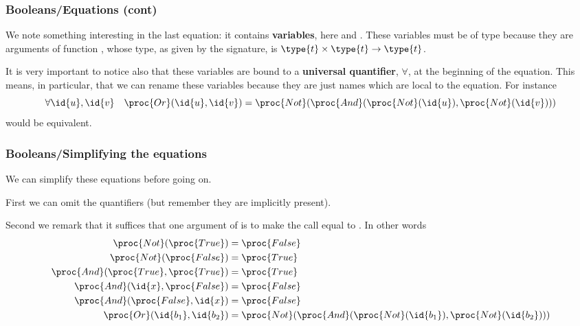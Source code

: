 %
\begin{frame}
\frametitle{Booleans/Equations (cont)}

We note something interesting in the last equation: it contains
\textbf{variables}, here  and . These variables must
be of type  because they are arguments of function ,
whose type, as given by the signature, is \(\type{t} \times \type{t}
\rightarrow \type{t}\).

\bigskip

It is very important to notice also that these variables are bound to
a \textbf{universal quantifier}, \textbf{\(\forall\)}, at the
beginning of the equation. This means, in particular, that we can
rename these variables because they are just names which are local to
the equation. For instance
\[
  \forall \id{u}, \id{v} \quad \proc{Or} (\id{u}, \id{v}) 
= \proc{Not} (\proc{And} (\proc{Not} (\id{u}), \proc{Not} (\id{v})))
\]
would be equivalent.

\end{frame}

%
\begin{frame}
\frametitle{Booleans/Simplifying the equations}

We can simplify these equations before going on. 

\bigskip

First we can omit the quantifiers (but remember they are implicitly
present).

\bigskip

Second we remark that it suffices that one argument of  is
 to make the call equal to . In other words
\begin{align*}
\proc{Not} (\proc{True}) &= \proc{False}\\
\proc{Not} (\proc{False}) &= \proc{True}\\
\proc{And} (\proc{True}, \proc{True}) &= \proc{True}\\
\proc{And} (\id{x}, \proc{False}) &= \proc{False}\\
\proc{And} (\proc{False}, \id{x}) &= \proc{False}\\
\proc{Or} (\id{b_1}, \id{b_2}) &= \proc{Not} (\proc{And} (\proc{Not}
(\id{b_1}), \proc{Not} (\id{b_2})))
\end{align*}

\end{frame}

